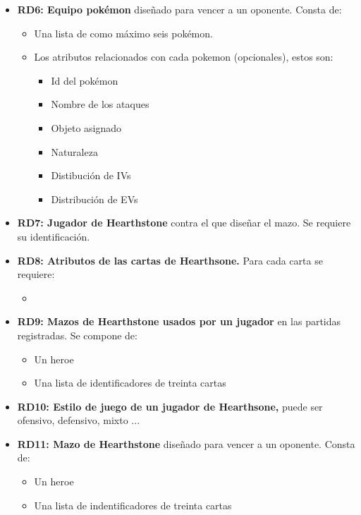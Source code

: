 \begin{itemize}
		\item \textbf{RD6: Equipo pokémon} diseñado para vencer a un oponente.
			Consta de:
			\begin{itemize}
				\item Una lista de como máximo seis pokémon.
				\item Los atributos relacionados con cada pokemon
					(opcionales), estos son:
					\begin{itemize}
						\item Id del pokémon
						\item Nombre de los ataques
						\item Objeto asignado
						\item Naturaleza
						\item Distibución de IVs
						\item Distribución de EVs
					\end{itemize}
			\end{itemize}

		\item \textbf{RD7: Jugador de Hearthstone} contra el que diseñar el mazo.
			Se requiere su identificación.

		\item \textbf{RD8: Atributos de las cartas de Hearthsone.} Para cada
			carta se requiere:
			\begin{itemize}
				\item 
			\end{itemize}

		\item \textbf{RD9: Mazos de Hearthstone usados por un jugador} en las
			partidas registradas. Se compone de:
			\begin{itemize}
				\item Un heroe
				\item Una lista de identificadores de treinta cartas
			\end{itemize}

		\item \textbf{RD10: Estilo de juego de un jugador de Hearthsone,} puede
			ser ofensivo, defensivo, mixto ...

		\item \textbf{RD11: Mazo de Hearthstone} diseñado para vencer a un
			oponente. Consta de:
			\begin{itemize}
				\item Un heroe
				\item Una lista de indentificadores de treinta cartas
			\end{itemize}
	\end{itemize}


